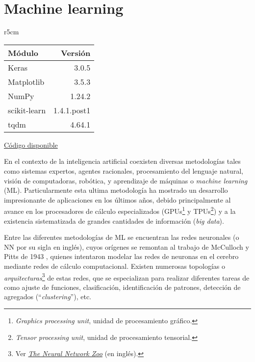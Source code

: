 

 \chapter{Machine learning} \label{ch:machine}   
\begin{wraptable}{r}{5cm}
\begin{modulesinfo}
\begin{center}
{\small
    \begin{tabular}{l r}
        \toprule
        \textbf{Módulo} & \textbf{Versión} \\
        \midrule
        Keras & 3.0.5 \\
        Matplotlib & 3.5.3 \\
        NumPy & 1.24.2 \\
        scikit-learn & 1.4.1.post1 \\
        tqdm & 4.64.1 \\
        \bottomrule
    \end{tabular}
    \vspace{0.75em}
    
    \href{https://github.com/facundobatista/libro-pyciencia/tree/master/código/machine_learning/}{Código disponible}
}
\end{center}
\end{modulesinfo}
\end{wraptable}

En el contexto de la inteligencia artificial coexisten diversas metodologías tales como sistemas expertos, agentes racionales, procesamiento del lenguaje natural, visión de computadoras, robótica, y aprendizaje de máquinas o \textit{machine learning} (ML). Particularmente esta ultima metodología ha mostrado un desarrollo impresionante de aplicaciones en los últimos años, debido principalmente al avance en los procesadores de cálculo especializados (GPUs\footnote{\textit{Graphics processing unit}, unidad de procesamiento gráfico.} y TPUs\footnote{\textit{Tensor processing unit}, unidad de procesamiento tensorial.}) y a la existencia sistematizada de grandes cantidades de información (\textit{big data}).

 Entre las diferentes metodologías de ML se encuentran las redes neuronales (o NN por su sigla en inglés), cuyos orígenes se remontan al trabajo de McCulloch y Pitts de 1943 \cite{McCulloch1943}, quienes intentaron modelar las redes de neuronas en el cerebro mediante redes de cálculo computacional. Existen numerosas topologías o \textit{arquitecturas}\footnote{Ver \href{https://www.asimovinstitute.org/neural-network-zoo/}{\textit{The Neural Network Zoo}} (en inglés).} de estas redes, que se especializan para realizar diferentes tareas de como ajuste de funciones, clasificación, identificación de patrones, detección de agregados (``\textit{clustering}''), etc.

